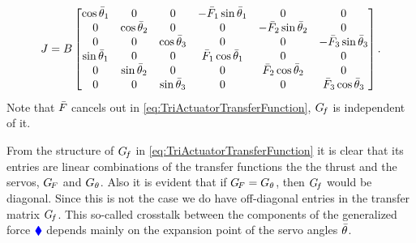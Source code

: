 \begin{align}
 J = B
 \begin{bmatrix}
  \cos\aServoStat[1] & 0 & 0 & -\PropForceStat[1] \sin\aServoStat[1] & 0 & 0 \\
  0 & \cos\aServoStat[2] & 0 & 0 & -\PropForceStat[2] \sin\aServoStat[2] & 0 \\
  0 & 0 & \cos\aServoStat[3] & 0 & 0 & -\PropForceStat[3] \sin\aServoStat[3] \\
  \sin\aServoStat[1] & 0 & 0 & \PropForceStat[1] \cos\aServoStat[1] & 0 & 0 \\
  0 & \sin\aServoStat[2] & 0 & 0 & \PropForceStat[2] \cos\aServoStat[2] & 0 \\
  0 & 0 & \sin\aServoStat[3] & 0 & 0 & \PropForceStat[3] \cos\aServoStat[3] \\
 \end{bmatrix}
 .
\end{align}
Note that $\PropForceStat$ cancels out in \eqref{eq:TriActuatorTransferFunction}, \ie $\GenForceTransferFunction$ is independent of it.

From the structure of $\GenForceTransferFunction$ in \eqref{eq:TriActuatorTransferFunction} it is clear that its entries are linear combinations of the transfer functions the the thrust and the servos, $\ThrustTransferFunction$ and $\ServoTransferFunction$.
Also it is evident that if $\ThrustTransferFunction = \ServoTransferFunction$, then $\GenForceTransferFunction$ would be diagonal.
Since this is not the case we do have off-diagonal entries in the transfer matrix $\GenForceTransferFunction$.
This so-called crosstalk between the components of the generalized force $\genForce$ depends mainly on the expansion point of the servo angles $\aServoStat$.

